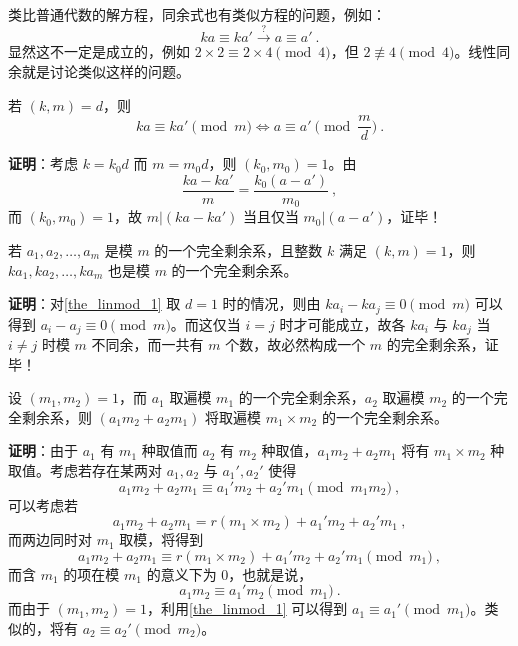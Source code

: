 

类比普通代数的解方程，同余式也有类似方程的问题，例如：
\begin{equation}
ka \equiv ka' \xrightarrow{?} a \equiv a'  ~.
\end{equation}
显然这不一定是成立的，例如 $2 \times 2 \equiv 2 \times 4 \pmod 4$，但 $2 \not \equiv 4 \pmod 4$。线性同余就是讨论类似这样的问题。

\begin{theorem}{}\label{the_linmod_1}
若 $(k, m) = d$，则
\begin{equation}
ka \equiv ka' \pmod m \Leftrightarrow a \equiv a' \pmod{\frac{m}{d}} ~.
\end{equation}
\end{theorem}
\textbf{证明}：考虑 $k = k_0 d$ 而 $m = m_0 d$，则 $(k_0, m_0) = 1$。由
\begin{equation}
\frac{ka - ka'}{m} = \frac{k_0(a - a')}{m_0} ~,
\end{equation}
而 $(k_0, m_0) = 1$，故 $m | (k a - k a')$ 当且仅当 $m_0 | (a - a')$，证毕！

\begin{theorem}{}\label{the_linmod_2}
若 $a_1, a_2, \dots, a_m$ 是模 $m$ 的一个完全剩余系，且整数 $k$ 满足 $(k, m) =1$，则 $ka_1, ka_2, \dots, ka_m$ 也是模 $m$ 的一个完全剩余系。
\end{theorem}
\textbf{证明}：对\autoref{the_linmod_1} 取 $d=1$ 时的情况，则由 $ka_i - ka_j \equiv 0 \pmod m$ 可以得到 $a_i - a_j \equiv 0 \pmod m$。而这仅当 $i = j$ 时才可能成立，故各 $ka_i$ 与 $ka_j$ 当 $i \neq j$ 时模 $m$ 不同余，而一共有 $m$ 个数，故必然构成一个 $m$ 的完全剩余系，证毕！

\begin{theorem}{}\label{the_linmod_3}
设 $(m_1, m_2) = 1$，而 $a_1$ 取遍模 $m_1$ 的一个完全剩余系，$a_2$ 取遍模 $m_2$ 的一个完全剩余系，则 $(a_1 m_2 + a_2 m_1)$ 将取遍模 $m_1 \times m_2$ 的一个完全剩余系。
\end{theorem}
\textbf{证明}：由于 $a_1$ 有 $m_1$ 种取值而 $a_2$ 有 $m_2$ 种取值，$a_1m_2+a_2m_1$ 将有 $m_1 \times m_2$ 种取值。考虑若存在某两对 $a_1, a_2$ 与 $a_1', a_2'$ 使得
\begin{equation}
a_1 m_2 + a_2 m_1 \equiv a_1' m_2+ a_2' m_1 \pmod{m_1 m_2} ~,
\end{equation}
可以考虑若
\begin{equation}
a_1 m_2 + a_2 m_1= r(m_1 \times m_2) + a_1' m_2 + a_2' m_1 ~,
\end{equation}
而两边同时对 $m_1$ 取模，将得到
\begin{equation}
a_1 m_2 + a_2 m_1 \equiv r(m_1 \times m_2) + a_1' m_2 + a_2' m_1  \pmod{m_1} ~,
\end{equation}
而含 $m_1$ 的项在模 $m_1$ 的意义下为 $0$，也就是说，
\begin{equation}
a_1 m_2 \equiv a_1' m_2 \pmod{m_1} ~.
\end{equation}
而由于 $(m_1, m_2) = 1$，利用\autoref{the_linmod_1} 可以得到 $a_1 \equiv a_1' \pmod{m_1}$。类似的，将有 $a_2 \equiv a_2' \pmod{m_2}$。

